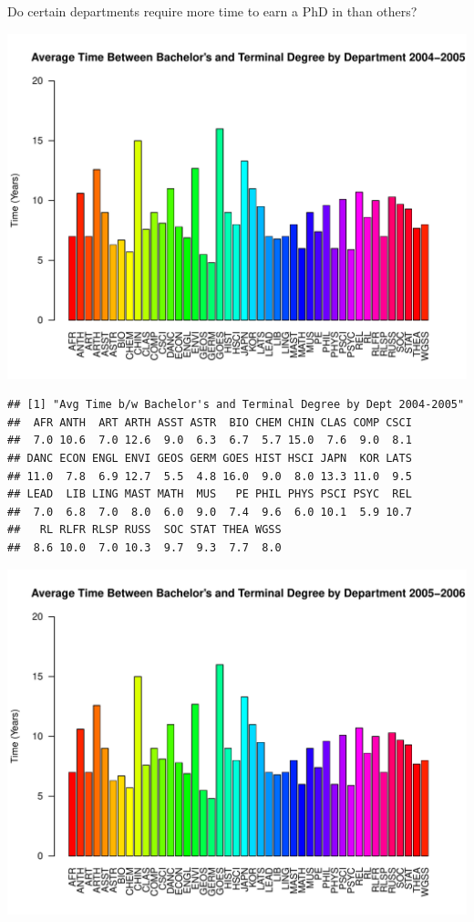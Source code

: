 \documentclass[12pt,a4paper]{article}\usepackage[]{graphicx}\usepackage[]{color}
\makeatletter
\def\maxwidth{ %
  \ifdim\Gin@nat@width>\linewidth
    \linewidth
  \else
    \Gin@nat@width
  \fi
}
\newenvironment{kframe}{%
 \def\at@end@of@kframe{}%
 \ifinner\ifhmode%
  \def\at@end@of@kframe{\end{minipage}}%
  \begin{minipage}{\columnwidth}%
 \fi\fi%
 \def\FrameCommand##1{\hskip\@totalleftmargin \hskip-\fboxsep
 \colorbox{shadecolor}{##1}\hskip-\fboxsep
     \hskip-\linewidth \hskip-\@totalleftmargin \hskip\columnwidth}%
 \MakeFramed {\advance\hsize-\width
   \@totalleftmargin\z@ \linewidth\hsize
   \@setminipage}}%
 {\par\unskip\endMakeFramed%
 \at@end@of@kframe}
\newenvironment{knitrout}{}{} %
\theoremstyle{definition}
\makeatother
\begin{document}
\bigskip
Do certain departments require more time to earn a PhD in than others?

\begin{knitrout}
\color{fgcolor}
\includegraphics[width=\maxwidth]{figure/unnamed-chunk-13-1} 
\begin{kframe}\begin{verbatim}
## [1] "Avg Time b/w Bachelor's and Terminal Degree by Dept 2004-2005"
##  AFR ANTH  ART ARTH ASST ASTR  BIO CHEM CHIN CLAS COMP CSCI 
##  7.0 10.6  7.0 12.6  9.0  6.3  6.7  5.7 15.0  7.6  9.0  8.1 
## DANC ECON ENGL ENVI GEOS GERM GOES HIST HSCI JAPN  KOR LATS 
## 11.0  7.8  6.9 12.7  5.5  4.8 16.0  9.0  8.0 13.3 11.0  9.5 
## LEAD  LIB LING MAST MATH  MUS   PE PHIL PHYS PSCI PSYC  REL 
##  7.0  6.8  7.0  8.0  6.0  9.0  7.4  9.6  6.0 10.1  5.9 10.7 
##   RL RLFR RLSP RUSS  SOC STAT THEA WGSS 
##  8.6 10.0  7.0 10.3  9.7  9.3  7.7  8.0
\end{verbatim}
\end{kframe}
\includegraphics[width=\maxwidth]{figure/unnamed-chunk-13-2} 

\end{knitrout}
\end{document}
